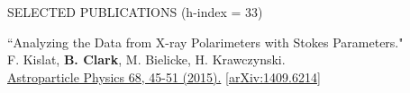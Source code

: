 \documentclass{resume} %
\begin{document}
\begin{rSection}{SELECTED PUBLICATIONS (h-index = 33)}
\begin{etaremune}


   \item ``Analyzing the Data from X-ray Polarimeters with Stokes Parameters." \\
 F. Kislat,  \textbf{B. Clark}, M. Bielicke, H. Krawczynski.  \\
  \href{http://dx.doi.org/10.1016/j.astropartphys.2015.02.007}{Astroparticle Physics 68, 45-51 (2015).} \href{https://arxiv.org/abs/1409.6214}{[arXiv:1409.6214]} 
  


 \end{etaremune}
 
\end{rSection}

\newpage

\end{document}
